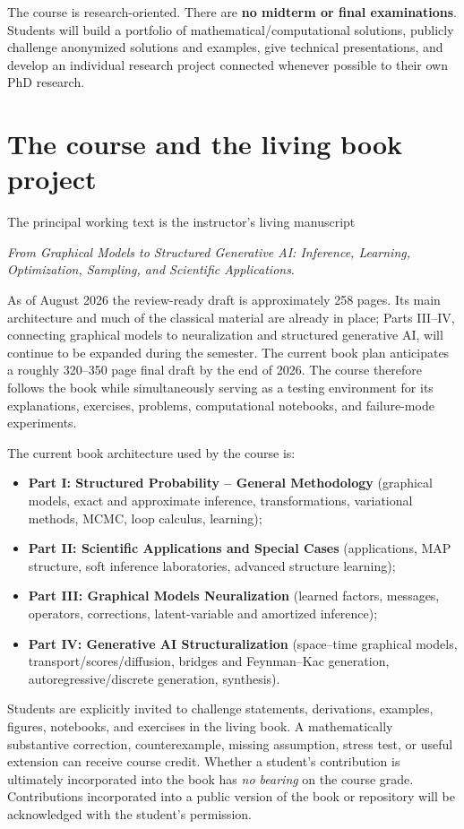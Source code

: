 \documentclass[11pt]{article}
\newcommand{\booktitle}{From Graphical Models to Structured Generative AI: Inference, Learning, Optimization, Sampling, and Scientific Applications}
\begin{document}
The course is research-oriented. There are \textbf{no midterm or final examinations}. Students will build a portfolio of mathematical/computational solutions, publicly challenge anonymized solutions and examples, give technical presentations, and develop an individual research project connected whenever possible to their own PhD research.

\section*{The course and the living book project}

The principal working text is the instructor's living manuscript
\begin{center}
\emph{\booktitle}.
\end{center}
As of August 2026 the review-ready draft is approximately 258 pages. Its main architecture and much of the classical material are already in place; Parts III--IV, connecting graphical models to neuralization and structured generative AI, will continue to be expanded during the semester. The current book plan anticipates a roughly 320--350 page final draft by the end of 2026. The course therefore follows the book while simultaneously serving as a testing environment for its explanations, exercises, problems, computational notebooks, and failure-mode experiments.

The current book architecture used by the course is:
\begin{itemize}
\item \textbf{Part I: Structured Probability -- General Methodology} (graphical models, exact and approximate inference, transformations, variational methods, MCMC, loop calculus, learning);
\item \textbf{Part II: Scientific Applications and Special Cases} (applications, MAP structure, soft inference laboratories, advanced structure learning);
\item \textbf{Part III: Graphical Models Neuralization} (learned factors, messages, operators, corrections, latent-variable and amortized inference);
\item \textbf{Part IV: Generative AI Structuralization} (space--time graphical models, transport/scores/diffusion, bridges and Feynman--Kac generation, autoregressive/discrete generation, synthesis).
\end{itemize}

Students are explicitly invited to challenge statements, derivations, examples, figures, notebooks, and exercises in the living book. A mathematically substantive correction, counterexample, missing assumption, stress test, or useful extension can receive course credit. Whether a student's contribution is ultimately incorporated into the book has \emph{no bearing} on the course grade. Contributions incorporated into a public version of the book or repository will be acknowledged with the student's permission.
\end{document}
